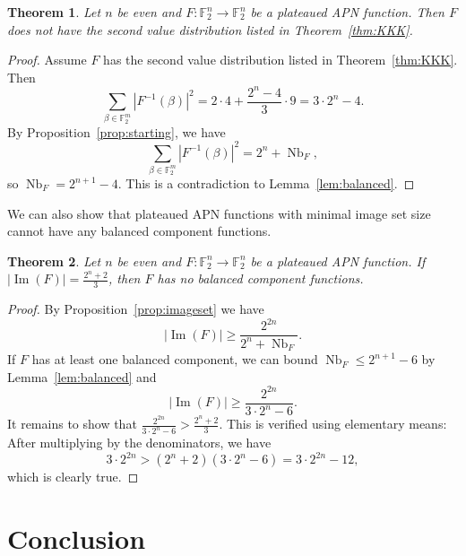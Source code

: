 \documentclass[11pt]{article}
\newcommand{\F}{\mathbb F}
\DeclareMathOperator{\Nb}{Nb}
\theoremstyle{plain}
\newtheorem{theorem}{Theorem}[section]
\theoremstyle{definition}
\numberwithin{theorem}{section}
\numberwithin{equation}{section}
\numberwithin{table}{section}
\numberwithin{figure}{section}
\DeclareMathOperator{\image}{Im}
\begin{document}
{\begin{theorem}\label{prop: 2nd impossible}
     Let $n$ be even and $F \colon \F_2^n \rightarrow \F_2^n$ be a plateaued APN function. Then $F$ does not have the second value distribution listed in Theorem~\ref{thm:KKK}.
\end{theorem}
\begin{proof}
    Assume $F$ has the second value distribution listed in Theorem~\ref{thm:KKK}. Then
     \[\sum_{\beta \in \F_{2}^m} |F^{-1}(\beta)|^2=2\cdot 4 + \frac{2^n-4}{3} \cdot 9=3\cdot 2^n-4.\]
     By Proposition~\ref{prop:starting}, we have 
     \[\sum_{\beta \in \F_{2}^m} |F^{-1}(\beta)|^2=2^n+\Nb_F,\]
     so $\Nb_F=2^{n+1}-4$. This is a contradiction to Lemma~\ref{lem:balanced}.
\end{proof}

We can also show that plateaued APN functions with minimal image set size cannot have any balanced component functions.
\begin{theorem} \label{thm:nobalanced}
    Let $n$ be even and $F \colon \F_2^n \rightarrow \F_2^n$ be a plateaued APN function. If $|\image(F)|=\frac{2^n+2}{3}$, then $F$ has no balanced component functions.
\end{theorem}
\begin{proof}
    By Proposition~\ref{prop:imageset} we have 
    \[|\image(F)| \geq \frac{2^{2n}}{2^n+\Nb_F}.\]
    If $F$ has at least one balanced component, we can bound $\Nb_F\leq 2^{n+1}-6$ by Lemma~\ref{lem:balanced} and
     \[|\image(F)| \geq \frac{2^{2n}}{3\cdot 2^n-6}.\]
    It remains to show that $\frac{2^{2n}}{3\cdot 2^n-6}>\frac{2^n+2}{3}$. This is verified using elementary means: After multiplying by the denominators, we have
    \[3\cdot 2^{2n}>(2^n+2)(3\cdot 2^n-6)=3\cdot 2^{2n}-12,\]
    which is clearly true.
\end{proof}


\section{Conclusion}\label{sec: concl}

}
\end{document}
